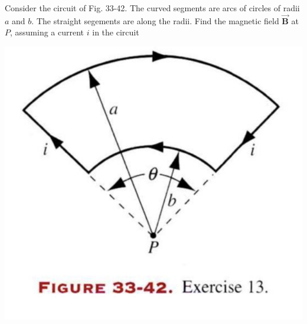 \documentclass[11pt,letterpaper,boxed]{hmcpset}
\begin{document}
\begin{problem}[HRK E33.13]
Consider the circuit of Fig. 33-42. The curved segments are arcs of circles of radii $a$ and $b$. The straight segements are along the radii. Find the magnetic field $\vec{\textbf{B}}$ at $P$, assuming a current $i$ in the circuit
\begin{center}
\includegraphics[scale=0.6]{33-42.png}
\end{center}
\end{problem}

\begin{solution}
\vfill
\end{solution}
\end{document}
